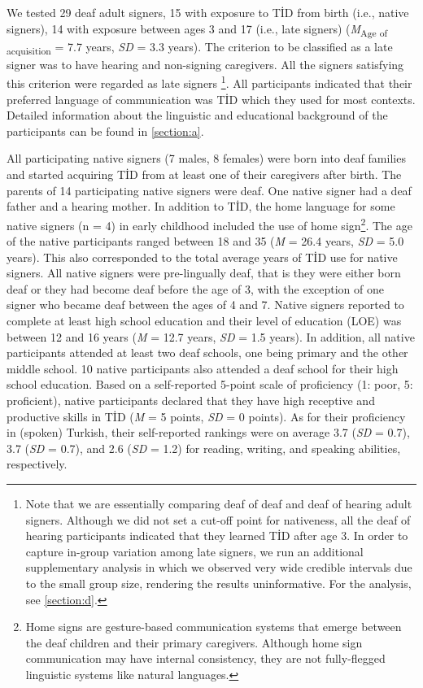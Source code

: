 \documentclass[]{elsarticle} %
\begin{document}
We tested 29 deaf adult signers, 15 with exposure to TİD from birth
(i.e., native signers), 14 with exposure between ages 3 and 17 (i.e.,
late signers) (\emph{M}\textsubscript{Age of acquisition} = 7.7 years,
\emph{SD} = 3.3 years). The criterion to be classified as a late signer
was to have hearing and non-signing caregivers. All the signers
satisfying this criterion were regarded as late signers
\footnote{Note that we are essentially comparing deaf of deaf and deaf of hearing adult signers. Although we did not set a cut-off point for nativeness, all the deaf of hearing participants indicated that they learned TİD after age 3. In order to capture in-group variation among late signers, we run an additional supplementary analysis in which we observed very wide credible intervals due to the small group size, rendering the results uninformative. For the analysis, see \ref{section:d}.}.
All participants indicated that their preferred language of
communication was TİD which they used for most contexts. Detailed
information about the linguistic and educational background of the
participants can be found in \ref{section:a}.

All participating native signers (7 males, 8 females) were born into
deaf families and started acquiring TİD from at least one of their
caregivers after birth. The parents of 14 participating native signers
were deaf. One native signer had a deaf father and a hearing mother. In
addition to TİD, the home language for some native signers (n = 4) in
early childhood included the use of home
sign\footnote{Home signs are gesture-based communication systems that emerge between the deaf children and their primary caregivers. Although home sign communication may have internal consistency, they are not fully-flegged linguistic systems like natural languages.}.
The age of the native participants ranged between 18 and 35 (\emph{M} =
26.4 years, \emph{SD} = 5.0 years). This also corresponded to the total
average years of TİD use for native signers. All native signers were
pre-lingually deaf, that is they were either born deaf or they had
become deaf before the age of 3, with the exception of one signer who
became deaf between the ages of 4 and 7. Native signers reported to
complete at least high school education and their level of education
(LOE) was between 12 and 16 years (\emph{M} = 12.7 years, \emph{SD} =
1.5 years). In addition, all native participants attended at least two
deaf schools, one being primary and the other middle school. 10 native
participants also attended a deaf school for their high school
education. Based on a self-reported 5-point scale of proficiency (1:
poor, 5: proficient), native participants declared that they have high
receptive and productive skills in TİD (\emph{M} = 5 points, \emph{SD} =
0 points). As for their proficiency in (spoken) Turkish, their
self-reported rankings were on average 3.7 (\emph{SD} = 0.7), 3.7
(\emph{SD} = 0.7), and 2.6 (\emph{SD} = 1.2) for reading, writing, and
speaking abilities, respectively.
\end{document}
